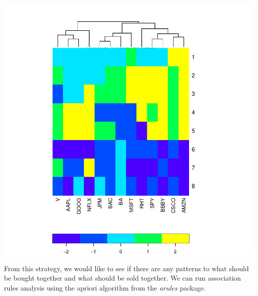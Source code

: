 \documentclass{article}
\begin{document}
\includegraphics{OptimalTrading-007}

From this strategy, we would like to see if there are any patterns to what
should be bought together and what should be sold together.  We can run
association rules analysis using the apriori algorithm from the \textit{arules}
package.
\end{document}
